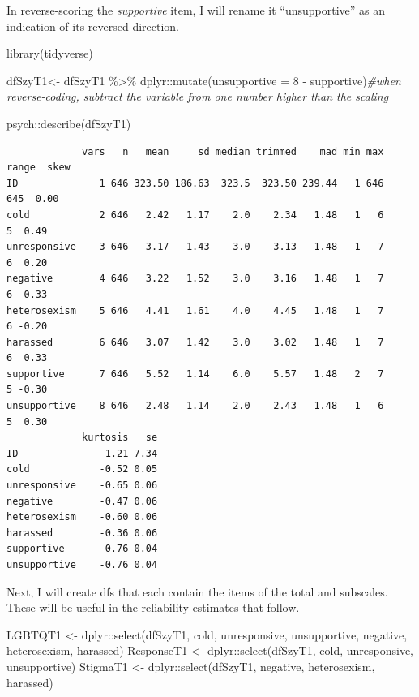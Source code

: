 \documentclass[
  english,
]{book}
\newenvironment{Shaded}{\begin{snugshade}}{\end{snugshade}}
\newcommand{\AttributeTok}[1]{\textcolor[rgb]{0.77,0.63,0.00}{#1}}
\newcommand{\CommentTok}[1]{\textcolor[rgb]{0.56,0.35,0.01}{\textit{#1}}}
\newcommand{\DecValTok}[1]{\textcolor[rgb]{0.00,0.00,0.81}{#1}}
\newcommand{\FunctionTok}[1]{\textcolor[rgb]{0.00,0.00,0.00}{#1}}
\newcommand{\NormalTok}[1]{#1}
\newcommand{\OtherTok}[1]{\textcolor[rgb]{0.56,0.35,0.01}{#1}}
\newcommand{\SpecialCharTok}[1]{\textcolor[rgb]{0.00,0.00,0.00}{#1}}
\begin{document}
In reverse-scoring the \emph{supportive} item, I will rename it ``unsupportive'' as an indication of its reversed direction.

\begin{Shaded}
\begin{Highlighting}[]
\FunctionTok{library}\NormalTok{(tidyverse)}

\NormalTok{dfSzyT1}\OtherTok{\textless{}{-}}\NormalTok{ dfSzyT1 }\SpecialCharTok{\%\textgreater{}\%}
\NormalTok{  dplyr}\SpecialCharTok{::}\FunctionTok{mutate}\NormalTok{(}\AttributeTok{unsupportive =} \DecValTok{8} \SpecialCharTok{{-}}\NormalTok{ supportive)}\CommentTok{\#when reverse{-}coding, subtract the variable from one number higher than the scaling}

\NormalTok{psych}\SpecialCharTok{::}\FunctionTok{describe}\NormalTok{(dfSzyT1)}
\end{Highlighting}
\end{Shaded}

\begin{verbatim}
             vars   n   mean     sd median trimmed    mad min max range  skew
ID              1 646 323.50 186.63  323.5  323.50 239.44   1 646   645  0.00
cold            2 646   2.42   1.17    2.0    2.34   1.48   1   6     5  0.49
unresponsive    3 646   3.17   1.43    3.0    3.13   1.48   1   7     6  0.20
negative        4 646   3.22   1.52    3.0    3.16   1.48   1   7     6  0.33
heterosexism    5 646   4.41   1.61    4.0    4.45   1.48   1   7     6 -0.20
harassed        6 646   3.07   1.42    3.0    3.02   1.48   1   7     6  0.33
supportive      7 646   5.52   1.14    6.0    5.57   1.48   2   7     5 -0.30
unsupportive    8 646   2.48   1.14    2.0    2.43   1.48   1   6     5  0.30
             kurtosis   se
ID              -1.21 7.34
cold            -0.52 0.05
unresponsive    -0.65 0.06
negative        -0.47 0.06
heterosexism    -0.60 0.06
harassed        -0.36 0.06
supportive      -0.76 0.04
unsupportive    -0.76 0.04
\end{verbatim}

Next, I will create dfs that each contain the items of the total and subscales. These will be useful in the reliability estimates that follow.

\begin{Shaded}
\begin{Highlighting}[]
\NormalTok{LGBTQT1 }\OtherTok{\textless{}{-}}\NormalTok{ dplyr}\SpecialCharTok{::}\FunctionTok{select}\NormalTok{(dfSzyT1, cold, unresponsive, unsupportive, negative, heterosexism, harassed)}
\NormalTok{ResponseT1 }\OtherTok{\textless{}{-}}\NormalTok{ dplyr}\SpecialCharTok{::}\FunctionTok{select}\NormalTok{(dfSzyT1, cold, unresponsive, unsupportive)}
\NormalTok{StigmaT1 }\OtherTok{\textless{}{-}}\NormalTok{ dplyr}\SpecialCharTok{::}\FunctionTok{select}\NormalTok{(dfSzyT1, negative, heterosexism, harassed)}
\end{Highlighting}
\end{Shaded}
\end{document}
